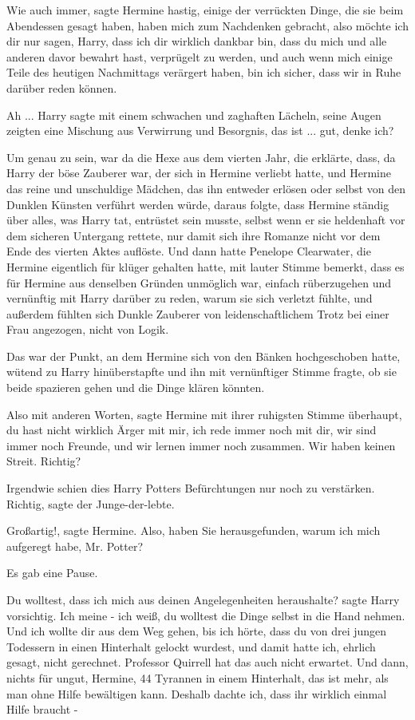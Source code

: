 \glqq{}Wie auch immer\grqq{}, sagte Hermine hastig, \glqq{}einige der verrückten
Dinge, die sie beim Abendessen gesagt haben, haben mich zum Nachdenken gebracht,
also möchte ich dir nur sagen, Harry, dass ich dir wirklich dankbar bin, dass du
mich und alle anderen davor bewahrt hast, verprügelt zu werden, und auch wenn
mich einige Teile des heutigen Nachmittags verärgert haben, bin ich sicher, dass
wir in Ruhe darüber reden können.\grqq{}

\glqq{}Ah ...\grqq{} Harry sagte mit einem schwachen und zaghaften Lächeln, seine
Augen zeigten eine Mischung aus Verwirrung und Besorgnis, \glqq{}das ist ... gut,
denke ich?\grqq{}

Um genau zu sein, war da die Hexe aus dem vierten Jahr, die erklärte, dass, da
Harry der böse Zauberer war, der sich in Hermine verliebt hatte, und Hermine das
reine und unschuldige Mädchen, das ihn entweder erlösen oder selbst von den
Dunklen Künsten verführt werden würde, daraus folgte, dass Hermine ständig über
alles, was Harry tat, entrüstet sein musste, selbst wenn er sie heldenhaft vor
dem sicheren Untergang rettete, nur damit sich ihre Romanze nicht vor dem Ende
des vierten Aktes auflöste. Und dann hatte Penelope Clearwater, die Hermine
eigentlich für klüger gehalten hatte, mit lauter Stimme bemerkt, dass es für
Hermine aus denselben Gründen unmöglich war, einfach rüberzugehen und vernünftig
mit Harry darüber zu reden, warum sie sich verletzt fühlte, und außerdem fühlten
sich Dunkle Zauberer von leidenschaftlichem Trotz bei einer Frau angezogen,
nicht von Logik.

Das war der Punkt, an dem Hermine sich von den Bänken hochgeschoben hatte,
wütend zu Harry hinüberstapfte und ihn mit vernünftiger Stimme fragte, ob sie
beide spazieren gehen und die Dinge klären könnten.

\glqq{}Also mit anderen Worten\grqq{}, sagte Hermine mit ihrer ruhigsten Stimme
überhaupt, \glqq{}du hast nicht wirklich Ärger mit mir, ich rede immer noch mit
dir, wir sind immer noch Freunde, und wir lernen immer noch zusammen. Wir haben
keinen Streit. Richtig?\grqq{}

Irgendwie schien dies Harry Potters Befürchtungen nur noch zu verstärken. \glqq{}
Richtig\grqq{}, sagte der Junge-der-lebte.

\glqq{}Großartig!\grqq{}, sagte Hermine. \glqq{}Also, haben Sie herausgefunden,
warum ich mich aufgeregt habe, Mr. Potter?\grqq{}

Es gab eine Pause.

\glqq{}Du wolltest, dass ich mich aus deinen Angelegenheiten heraushalte?\grqq{}
sagte Harry vorsichtig. \glqq{}Ich meine - ich weiß, du wolltest die Dinge selbst
in die Hand nehmen. Und ich wollte dir aus dem Weg gehen, bis ich hörte, dass du
von drei jungen Todessern in einen Hinterhalt gelockt wurdest, und damit hatte
ich, ehrlich gesagt, nicht gerechnet. Professor Quirrell hat das auch nicht
erwartet. Und dann, nichts für ungut, Hermine, 44 Tyrannen in einem Hinterhalt,
das ist mehr, als man ohne Hilfe bewältigen kann. Deshalb dachte ich, dass ihr
wirklich einmal Hilfe braucht -\grqq{}

